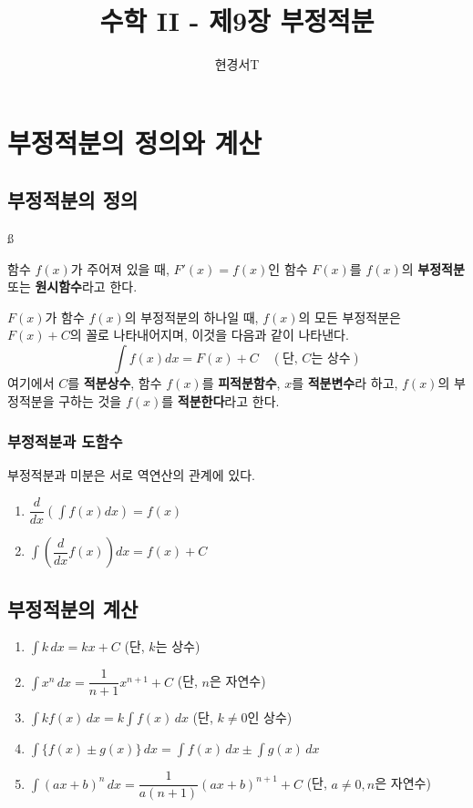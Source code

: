 \documentclass[a4paper,11pt]{article}
\title{\textbf{수학 II - 제9장 부정적분}}
\author{현경서T}
\date{}
\begin{document}
\maketitle

\section{부정적분의 정의와 계산}

\subsection{부정적분의 정의}ß

\begin{conceptbox}
함수 $f(x)$가 주어져 있을 때, $F'(x)=f(x)$인 함수 $F(x)$를 $f(x)$의 \textbf{부정적분} 또는 \textbf{원시함수}라고 한다.

$F(x)$가 함수 $f(x)$의 부정적분의 하나일 때, $f(x)$의 모든 부정적분은 $F(x)+C$의 꼴로 나타내어지며, 이것을 다음과 같이 나타낸다.
\[ \int f(x)dx = F(x) + C \quad (\text{단, } C\text{는 상수}) \]
여기에서 $C$를 \textbf{적분상수}, 함수 $f(x)$를 \textbf{피적분함수}, $x$를 \textbf{적분변수}라 하고, $f(x)$의 부정적분을 구하는 것을 $f(x)$를 \textbf{적분한다}라고 한다.
\end{conceptbox}

\subsubsection*{부정적분과 도함수}
부정적분과 미분은 서로 역연산의 관계에 있다.
\begin{enumerate}
    \item $\dfrac{d}{dx}\left(\int f(x)dx\right) = f(x)$
    \item $\int \left(\dfrac{d}{dx}f(x)\right)dx = f(x) + C$
\end{enumerate}


\subsection{부정적분의 계산}

\begin{conceptbox}
\begin{enumerate}
    \item $\int k \, dx = kx + C$ (단, $k$는 상수)
    \item $\int x^n \, dx = \dfrac{1}{n+1}x^{n+1} + C$ (단, $n$은 자연수)
    \item $\int k f(x) \, dx = k \int f(x) \, dx$ (단, $k \ne 0$인 상수)
    \item $\int \{f(x) \pm g(x)\} \, dx = \int f(x) \, dx \pm \int g(x) \, dx$
    \item $\int (ax+b)^n \, dx = \dfrac{1}{a(n+1)}(ax+b)^{n+1} + C$ (단, $a \ne 0, n$은 자연수)
\end{enumerate}
\end{conceptbox}
\end{document}
